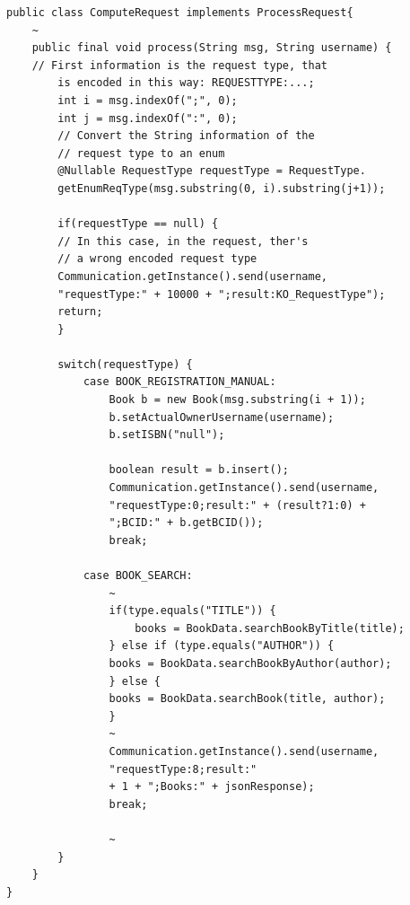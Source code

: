 \begin{lstlisting}
public class ComputeRequest implements ProcessRequest{
	~
	public final void process(String msg, String username) {
	// First information is the request type, that 
		is encoded in this way: REQUESTTYPE:...;
		int i = msg.indexOf(";", 0);
		int j = msg.indexOf(":", 0);
		// Convert the String information of the 
		// request type to an enum
		@Nullable RequestType requestType = RequestType.
		getEnumReqType(msg.substring(0, i).substring(j+1));

		if(requestType == null) {
		// In this case, in the request, ther's 
		// a wrong encoded request type
		Communication.getInstance().send(username,
		"requestType:" + 10000 + ";result:KO_RequestType");
		return;
		}

		switch(requestType) {
			case BOOK_REGISTRATION_MANUAL:
				Book b = new Book(msg.substring(i + 1));
				b.setActualOwnerUsername(username);
				b.setISBN("null");

				boolean result = b.insert();
				Communication.getInstance().send(username,
				"requestType:0;result:" + (result?1:0) + 
				";BCID:" + b.getBCID());
				break;
				
			case BOOK_SEARCH:
				~
				if(type.equals("TITLE")) {
					books = BookData.searchBookByTitle(title);
				} else if (type.equals("AUTHOR")) {
				books = BookData.searchBookByAuthor(author);
				} else {
				books = BookData.searchBook(title, author);
				}
				~
				Communication.getInstance().send(username, 
				"requestType:8;result:" 
				+ 1 + ";Books:" + jsonResponse);
				break;
				
				~
		}
	}
}
\end{lstlisting}
